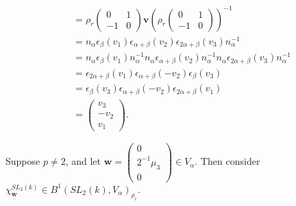 \begin{align*}
&=
\rho_r\left(\begin{matrix} 0 & 1 \\ -1 & 0\end{matrix}\right) \mathbf{v}\left( \rho_r\left(\begin{matrix} 0 & 1 \\ -1 & 0\end{matrix}\right)\right)^{-1} \\
&= 
n_ \alpha  \epsilon_ \beta (v_1)\epsilon_{\alpha+\beta}(v_2) \epsilon_{2\alpha+\beta}(v_3) n_ \alpha^{-1}\\
&= 
n_ \alpha  \epsilon_\beta (v_1) n_ \alpha^{-1}n_ \alpha \epsilon_{\alpha+\beta}(v_2) n_ \alpha^{-1} n_ \alpha \epsilon_{2\alpha+\beta}(v_3) n_ \alpha^{-1}\\
&= 
\epsilon_{2\alpha+\beta} (v_1) \epsilon_{\alpha+\beta}(-v_2)  \epsilon_{\beta}(v_3) \\
&= 
\epsilon_{\beta}(v_3) \epsilon_{\alpha+\beta}(-v_2) \epsilon_{2\alpha+\beta} (v_1)\\
&= \left(\begin{matrix} v_3 \\ -v_2 \\ v_1 \end{matrix}\right).
\end{align*}

Suppose $p\neq 2$, and let $\mathbf{w} = \left(\begin{matrix}0\\2^{-1}\mu_3\\0\end{matrix}\right)\in V_\alpha$. Then consider $\chi^{SL_2(k)}_\mathbf{w} \in B^1(SL_2(k), V_\alpha)_{\rho_r}$.

